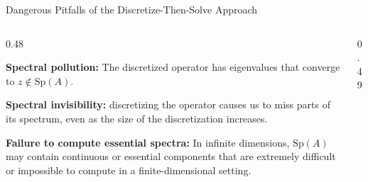 \documentclass[aspectratio=169]{beamer}
\begin{document}
\begin{frame}{Dangerous Pitfalls of the Discretize-Then-Solve Approach}

    

\begin{columns}[T,onlytextwidth]

\begin{column}{0.48\textwidth}
\small

\textbf{Spectral pollution:}  
The discretized operator has eigenvalues that converge to $z \notin \text{Sp}(A).$

\vspace{2em}

\textbf{Spectral invisibility:}  
discretizing the operator causes us to miss parts of its spectrum,
even as the size of the discretization increases.


\vspace{2em}

\textbf{Failure to compute essential spectra:}  
In infinite dimensions, $\text{Sp}(A)$ may contain continuous or essential components that are extremely difficult or impossible to compute in a finite-dimensional setting.

\end{column}

\begin{column}{0.49\textwidth}
\centering
{}
\end{column}
\end{columns}
\end{frame}
\end{document}

